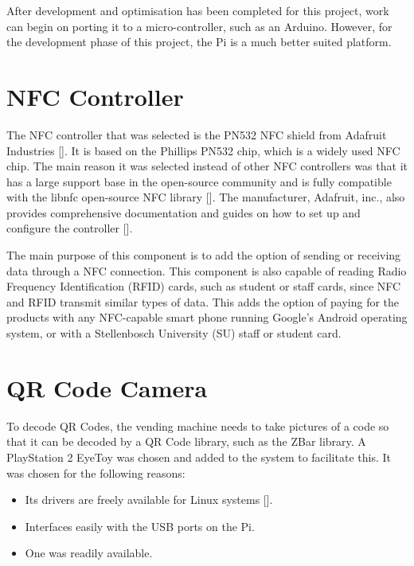 After development and optimisation has been completed for this project, work can begin on porting it to 
a micro-controller, such as an Arduino. However, for the development phase of this project,
 the Pi is a much better suited platform.

\section{NFC Controller}
\label{sec:nfc-controller}

The NFC controller that was selected is the PN532 NFC shield from Adafruit Industries
[\cite{website:adafruit-nfc}]. It is based on
the Phillips PN532 chip, which is a widely used NFC chip. The main reason it was selected instead
of other NFC controllers was that it has a large support base in the open-source
community and is fully compatible with the libnfc open-source NFC library
[\cite{website:libnfc-hardware}]. The manufacturer, Adafruit, inc., also provides
comprehensive documentation and guides on how to set up and configure the controller
[\cite{website:adafruit-tutorial}].
 
The main purpose of this component is to add the option of sending or receiving data
through a NFC connection.
This component is also capable of reading Radio Frequency Identification (RFID)
cards, such as student or staff cards, since NFC and RFID transmit similar types of data. This adds the option of paying for the products with 
any NFC-capable smart phone running Google's Android operating system, or with a
Stellenbosch University (SU) staff or student card.

\section{QR Code Camera}
\label{sec:webcam}

To decode QR Codes, the vending machine needs to take pictures of a code so that it can be
decoded by a QR Code library, such as the ZBar library. A PlayStation 2 EyeToy was
chosen and added to the system to facilitate this. It was chosen for the following reasons:

\begin{itemize}
  \item Its drivers are freely available for Linux systems [\cite{website:webcam-drivers}].
  \item Interfaces easily with the USB ports on the Pi.
  \item One was readily available.
\end{itemize}

